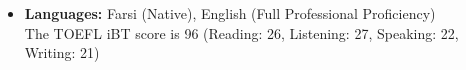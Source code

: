 \documentclass[12pt]{article}
\begin{document}
\begin{itemize}

	\vspace{4pt}
	\item \textbf{Languages:} Farsi (Native), English (Full Professional Proficiency) %
	\vspace{1pt} \\
	The TOEFL iBT score is 96 (Reading: 26, Listening: 27, Speaking: 22, Writing: 21)
\end{itemize}
\end{document}
